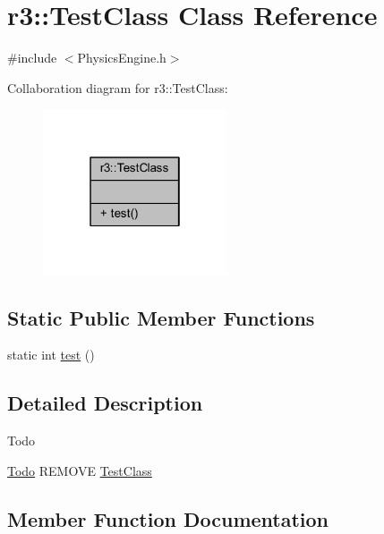 \hypertarget{classr3_1_1_test_class}{}\section{r3\+:\+:Test\+Class Class Reference}
\label{classr3_1_1_test_class}


{\ttfamily \#include $<$Physics\+Engine.\+h$>$}



Collaboration diagram for r3\+:\+:Test\+Class\+:\nopagebreak
\begin{figure}[H]
\begin{center}
\leavevmode
\includegraphics[width=154pt]{classr3_1_1_test_class__coll__graph}
\end{center}
\end{figure}
\subsection*{Static Public Member Functions}
\begin{DoxyCompactItemize}
\item 
static int \mbox{\hyperlink{classr3_1_1_test_class_a145788f0dab401fd9ffa6b75af82d20a}{test}} ()
\end{DoxyCompactItemize}


\subsection{Detailed Description}
\begin{DoxyRefDesc}{Todo}
\item[\mbox{\hyperlink{todo__todo000003}{Todo}}]R\+E\+M\+O\+VE \mbox{\hyperlink{classr3_1_1_test_class}{Test\+Class}} \end{DoxyRefDesc}


\subsection{Member Function Documentation}
\mbox{\label{classr3_1_1_test_class_a145788f0dab401fd9ffa6b75af82d20a}} 
